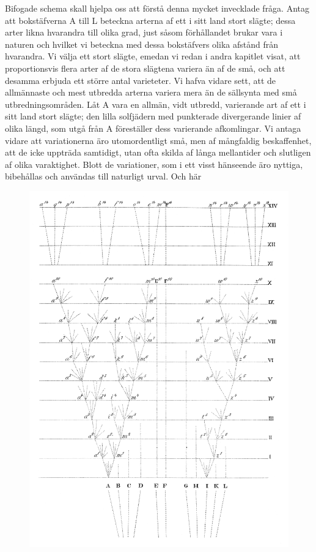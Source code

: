Bifogade schema skall hjelpa oss att förstå denna mycket invecklade fråga. Antag att bokstäfverna A till L beteckna arterna af ett i sitt land stort slägte; dessa arter likna hvarandra till olika grad, just såsom förhållandet brukar vara i naturen och hvilket vi beteckna med dessa bokstäfvers olika afstånd från hvarandra. Vi välja ett stort slägte, emedan vi redan i andra kapitlet visat, att proportionsvis flera arter af de stora slägtena variera än af de små, och att desamma erbjuda ett större antal varieteter. Vi hafva vidare sett, att de allmännaste och mest utbredda arterna variera mera än de sällsynta med små utbredningsområden. Låt A vara en allmän, vidt utbredd, varierande art af ett i sitt land stort slägte; den lilla solfjädern med punkterade divergerande linier af olika längd, som utgå från A föreställer dess varierande afkomlingar. Vi antaga vidare att variationerna äro utomordentligt små, men af mångfaldig beskaffenhet, att de icke uppträda samtidigt, utan ofta skilda af långa mellantider och slutligen af olika varaktighet. Blott de variationer, som i ett visst hänseende äro nyttiga, bibehållas och användas till naturligt urval. Och här

\begin{figure}
\includegraphics{bilder/plansch_1.png}
\label{fig:inverkan}
\end{figure}

